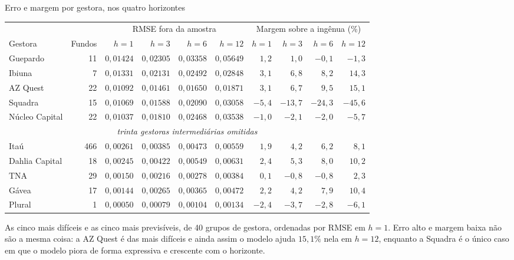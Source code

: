 \documentclass[aspectratio=169,11pt]{beamer}
\begin{document}
\begin{frame}{Erro e margem por gestora, nos quatro horizontes}

\centering
\scriptsize
\setlength{\tabcolsep}{3.2pt}
\begin{tabular}{@{}lr rrrr rrrr@{}}
\toprule
& & \multicolumn{4}{c}{RMSE fora da amostra} & \multicolumn{4}{c}{Margem sobre a ingênua (\%)} \\
\cmidrule(lr){3-6}\cmidrule(lr){7-10}
Gestora & Fundos & $h{=}1$ & $h{=}3$ & $h{=}6$ & $h{=}12$ & $h{=}1$ & $h{=}3$ & $h{=}6$ & $h{=}12$ \\
\midrule
Guepardo & 11 & $0{,}01424$ & $0{,}02305$ & $0{,}03358$ & $0{,}05649$ & $1{,}2$ & $1{,}0$ & $-0{,}1$ & $-1{,}3$ \\
Ibiuna & 7 & $0{,}01331$ & $0{,}02131$ & $0{,}02492$ & $0{,}02848$ & $3{,}1$ & $6{,}8$ & $8{,}2$ & $14{,}3$ \\
AZ Quest & 22 & $0{,}01092$ & $0{,}01461$ & $0{,}01650$ & $0{,}01871$ & $3{,}1$ & $6{,}7$ & $9{,}5$ & $15{,}1$ \\
Squadra & 15 & $0{,}01069$ & $0{,}01588$ & $0{,}02090$ & $0{,}03058$ & $-5{,}4$ & $-13{,}7$ & $-24{,}3$ & $-45{,}6$ \\
Núcleo Capital & 22 & $0{,}01037$ & $0{,}01810$ & $0{,}02468$ & $0{,}03538$ & $-1{,}0$ & $-2{,}1$ & $-2{,}0$ & $-5{,}7$ \\
\midrule
\multicolumn{10}{c}{\textit{trinta gestoras intermediárias omitidas}} \\
\midrule
Itaú & 466 & $0{,}00261$ & $0{,}00385$ & $0{,}00473$ & $0{,}00559$ & $1{,}9$ & $4{,}2$ & $6{,}2$ & $8{,}1$ \\
Dahlia Capital & 18 & $0{,}00245$ & $0{,}00422$ & $0{,}00549$ & $0{,}00631$ & $2{,}4$ & $5{,}3$ & $8{,}0$ & $10{,}2$ \\
TNA & 29 & $0{,}00150$ & $0{,}00216$ & $0{,}00278$ & $0{,}00384$ & $0{,}1$ & $-0{,}8$ & $-0{,}8$ & $2{,}3$ \\
Gávea & 17 & $0{,}00144$ & $0{,}00265$ & $0{,}00365$ & $0{,}00472$ & $2{,}2$ & $4{,}2$ & $7{,}9$ & $10{,}4$ \\
Plural & 1 & $0{,}00050$ & $0{,}00079$ & $0{,}00104$ & $0{,}00134$ & $-2{,}4$ & $-3{,}7$ & $-2{,}8$ & $-6{,}1$ \\
\bottomrule
\end{tabular}

\vspace{0.55em}
\raggedright
\small
As cinco mais difíceis e as cinco mais previsíveis, de 40 grupos de gestora, ordenadas por
RMSE em $h=1$. Erro alto e margem baixa não são a mesma coisa: a AZ Quest é das mais
difíceis e ainda assim o modelo ajuda $15{,}1\%$ nela em $h=12$, enquanto a Squadra é o único
caso em que o modelo piora de forma expressiva e crescente com o horizonte.

\end{frame}
\end{document}
